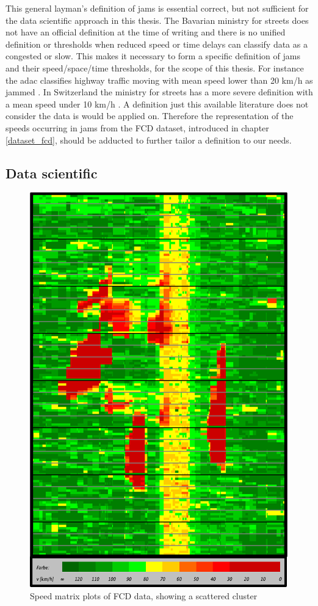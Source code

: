\documentclass[a4paper,headsepline,footsepline,fontsize=11pt,BCOR=12mm,DIV=12]{report}
\begin{document}
This general layman's definition of jams is essential correct, but not sufficient for the data scientific approach in this thesis. The Bavarian ministry for streets does not have an official definition at the time of writing and there is no unified definition or thresholds when reduced speed or time delays can classify data as a congested or slow. This makes it necessary to form a specific definition of \glspl{jam} and their speed/space/time thresholds, for the scope of this thesis. For instance the \acrshort{adac} classifies highway traffic moving with mean speed lower than 20 km/h as jammed \cite{ADAC2019}. In Switzerland the ministry for streets has a more severe definition with a mean speed under 10 km/h \cite{ASTRA2020}. A definition just this available literature does not consider the data is would be applied on. Therefore the representation of the speeds occurring in jams from the FCD dataset, introduced in chapter \ref{dataset_fcd}, should be adducted to further tailor a definition to our needs. 

\subsection{Data scientific}

\begin{figure}[h]
	\centering
	\includegraphics[scale=0.8]{./assets/SpeedMatrixPlot_single}
	\caption{Speed matrix plots of FCD data, showing a scattered cluster}
	\label{img:speedMatrixPlot_singleCluster}
\end{figure}
\end{document}
